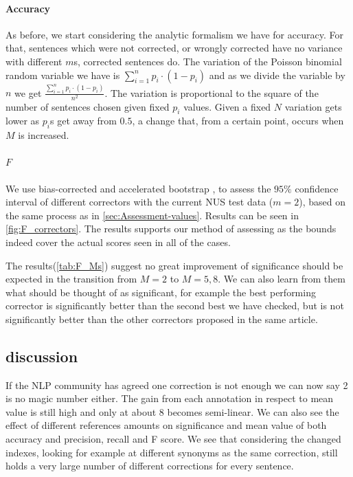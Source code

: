 \documentclass[english]{article}
\begin{document}
\paragraph{Accuracy}As before, we start considering the analytic formalism we have for accuracy. For that, sentences which were not corrected, or wrongly corrected have no variance with different $m$s, corrected sentences do. The variation of the Poisson binomial random variable we have is $\sum_{i=1}^{n}p_i\cdot\left(1-p_i\right)$ and as we divide the variable by $n$ we get $\frac{\sum_{i=1}^{n}p_i\cdot\left(1-p_i\right)}{n^2}$. 
The variation is proportional to the square of the number of sentences chosen given fixed $p_i$ values. Given a fixed $N$ variation gets lower as $p_i$s get away from $0.5$, a change that, from a certain point, occurs when $M$ is increased.

\paragraph{$F$}We use bias-corrected and accelerated bootstrap \cite{efron1987better}, to assess the $95\%$ confidence interval of different correctors with the current NUS test data ($m=2$), based on the same process as in \ref{sec:Assessment-values}. Results can be seen in \ref{fig:F_correctors}. The results supports our method of assessing as the bounds indeed cover the actual scores seen in all of the cases.

The results(\ref{tab:F_Ms}) suggest no great improvement of significance should be expected in the transition from $M=2$ to $M=5,8$. We can also learn from them what should be thought of as significant, for example the best performing corrector is significantly better than the second best we have checked, but is not significantly better than the other correctors proposed in the same article\cite{rozovskaya2016grammatical}.

\subsection{discussion}

If the NLP community has agreed one correction is not enough\cite{tetreault2008native}
we can now say 2 is no magic number either. The gain from each annotation in respect to mean value is still high and only at about 8 becomes semi-linear. We can also see the effect of different references amounts on significance and mean value of both accuracy and precision, recall and F score.
We see that considering the changed indexes, looking for example at different synonyms as the same correction, still holds a very large number of different corrections for every sentence.
\end{document}

